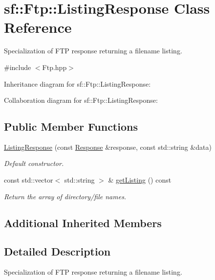 \hypertarget{classsf_1_1_ftp_1_1_listing_response}{}\section{sf\+:\+:Ftp\+:\+:Listing\+Response Class Reference}
\label{classsf_1_1_ftp_1_1_listing_response}


Specialization of F\+TP response returning a filename listing.  




{\ttfamily \#include $<$Ftp.\+hpp$>$}



Inheritance diagram for sf\+:\+:Ftp\+:\+:Listing\+Response\+:


Collaboration diagram for sf\+:\+:Ftp\+:\+:Listing\+Response\+:
\subsection*{Public Member Functions}
\begin{DoxyCompactItemize}
\item 
\hyperlink{classsf_1_1_ftp_1_1_listing_response_a7e98d0aed70105c71adb52e5b6ce0bb8}{Listing\+Response} (const \hyperlink{classsf_1_1_ftp_1_1_response}{Response} \&response, const std\+::string \&data)
\begin{DoxyCompactList}\small\item\em Default constructor. \end{DoxyCompactList}\item 
const std\+::vector$<$ std\+::string $>$ \& \hyperlink{classsf_1_1_ftp_1_1_listing_response_a6cdcdfcc6a9008c7e1eddb48b164793d}{get\+Listing} () const
\begin{DoxyCompactList}\small\item\em Return the array of directory/file names. \end{DoxyCompactList}\end{DoxyCompactItemize}
\subsection*{Additional Inherited Members}


\subsection{Detailed Description}
Specialization of F\+TP response returning a filename listing. 

